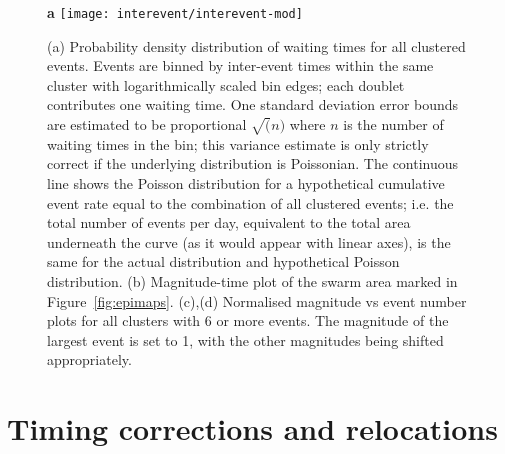 \documentclass[reviewcopy]{elsarticle}
\renewcommand{\includegraphics}[2][]{\fbox{#2}}
\begin{document}
\begin{figure}
{\sf \bf a}
\texttt{[image: interevent/interevent-mod]}

\caption{(a) Probability density distribution of waiting  times for all clustered events.  Events are binned by
inter-event times within the same cluster with logarithmically scaled
bin edges; each doublet
contributes one waiting time. One standard deviation error bounds are
estimated to be proportional $\sqrt(n)$ where $n$ is the number of
waiting times in the bin; this variance estimate is only strictly
correct if the underlying distribution is Poissonian.  The continuous
line shows the Poisson distribution for a hypothetical cumulative
event rate equal to the combination of all clustered events; i.e. the
total number of events per day, equivalent to the total area underneath the
curve (as it would appear with linear axes), is the same for the
actual distribution and hypothetical Poisson distribution. (b)
Magnitude-time plot of the swarm area marked in
Figure~\ref{fig:epimaps}. (c),(d) Normalised magnitude vs event number
plots for all clusters with 6 or more events. The magnitude of the
largest event is set to 1, with the other magnitudes being shifted appropriately.}
\label{fig:clust-statistics}
\end{figure}


\clearpage

\appendix
\setcounter{figure}{0}
\renewcommand{\thefigure}{A\arabic{figure}}



\section{Timing corrections and relocations}
\end{document}
